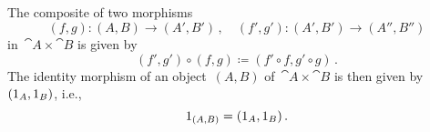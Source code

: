 \subsection{}

The composite of two morphisms
\[
	(f, g) \colon (A, B) \to (A', B') \,,
	\quad
	(f', g') \colon (A', B') \to (A'', B'')
\]
in~$\cat{A} × \cat{B}$ is given by
\[
	(f', g') ∘ (f, g)
	≔
	(f' ∘ f, g' ∘ g) \,.
\]
The identity morphism of an object~$(A, B)$ of~$\cat{A} × \cat{B}$ is then given by~$(1_A, 1_B)$, i.e.,
\[
	1_{(A, B)}
	=
	(1_A, 1_B) \,.
\]
